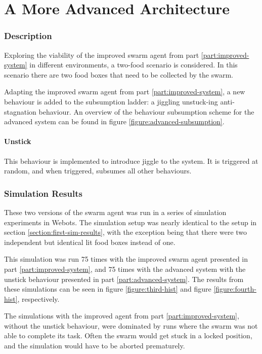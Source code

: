 \documentclass[a4paper]{article}
\begin{document}
\part{A More Advanced Architecture}
\label{part:advanced-system}

\section{Description}

Exploring the viability of the improved swarm agent from part \vref{part:improved-system} in different environments, a two-food scenario is considered.
In this scenario there are two food boxes that need to be collected by the swarm.

Adapting the improved swarm agent from part \ref{part:improved-system}, a new behaviour is added to the subsumption ladder: a jiggling unstuck-ing anti-stagnation behaviour.
An overview of the behaviour subsumption scheme for the advanced system can be found in figure \vref{figure:advanced-subsumption}.





\subsection{Unstick}
This behaviour is implemented to introduce jiggle to the system. It is triggered at random, and when triggered, subsumes all other behaviours. 

\section{Simulation Results}

These two versions of the swarm agent was run in a series of simulation experiments in Webots. The simulation setup was nearly identical to the setup in section \vref{section:first-sim-results}, with the exception being that there were two independent but identical lit food boxes instead of one.

This simulation was run 75 times with the improved swarm agent presented in part \vref{part:improved-system}, and 75 times with the advanced system with the unstick behaviour presented in part \vref{part:advanced-system}.
The results from these simulations can be seen in figure \vref{figure:third-hist} and figure \vref{figure:fourth-hist}, respectively.

The simulations with the improved agent from part \ref{part:improved-system}, without the unstick behaviour, were dominated by runs where the swarm was not able to complete its task.
Often the swarm would get stuck in a locked position, and the simulation would have to be aborted prematurely.
\end{document}
